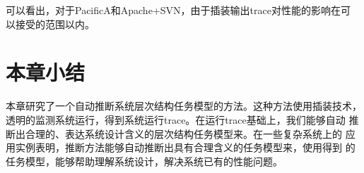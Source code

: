 可以看出，对于PacificA和Apache+SVN，由于插装输出trace对性能的影响在可
以接受的范围以内。

\section{本章小结}
\label{sec:scp:conclusion}

本章研究了一个自动推断系统层次结构任务模型的方法。这种方法使用插装技术，
透明的监测系统运行，得到系统运行trace。在运行trace基础上，我们能够自动
推断出合理的、表达系统设计含义的层次结构任务模型来。在一些复杂系统上的
应用实例表明，推断方法能够自动推断出具有合理含义的任务模型来，使用得到
的任务模型，能够帮助理解系统设计，解决系统已有的性能问题。

